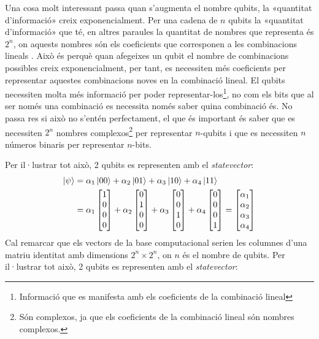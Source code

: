 Una cosa molt interessant passa quan s'augmenta el nombre qubits, la «quantitat d'informació» creix exponencialment. Per una cadena de $n$ qubits la «quantitat d'informació» que té, en altres paraules la quantitat de nombres que representa és $2^n$, on aquests nombres són els coeficients que corresponen a les combinacions lineals . Això és perquè quan afegeixes un qubit el nombre de combinacions possibles creix exponencialment, per tant, es necessiten més coeficients per representar aquestes combinacions noves en la combinació lineal. El qubits necessiten molta més informació per poder representar-los\footnote{Informació que es manifesta amb els coeficients de la combinació lineal}, no com els bits que al ser només una combinació es necessita només saber quina combinació és. No passa res si això no s'entén perfectament, el que és important és saber que es necessiten $2^n$ nombres complexos\footnote{Són complexos, ja que els coeficients de la combinació lineal són nombres complexos.} per representar $n$-qubits i que es necessiten $n$ números binaris per representar $n$-bits.

Per il·lustrar tot això, 2 qubits es representen amb el \textit{statevector}:
\begin{align*}
	\ket{\psi} &= \alpha_1\ket{00} + \alpha_2\ket{01} + \alpha_3\ket{10} + \alpha_4\ket{11}\\
	&= \alpha_1\begin{bmatrix} 1 \\ 0 \\ 0 \\ 0 \end{bmatrix} + \alpha_2 \begin{bmatrix} 0 \\ 1 \\ 0 \\ 0 \end{bmatrix} + \alpha_3 \begin{bmatrix} 0 \\ 0 \\ 1 \\ 0 \end{bmatrix} + \alpha_4\begin{bmatrix} 0 \\ 0 \\ 0 \\ 1 \end{bmatrix} 
	= \begin{bmatrix} \alpha_1 \\ \alpha_2 \\ \alpha_3 \\ \alpha_4 \end{bmatrix}
\end{align*}
Cal remarcar que els vectors de la base computacional serien les columnes d'una matriu identitat amb dimensions $2^n\times 2^n$, on $n$ és el nombre de qubits. Per il·lustrar tot això, 2 qubits es representen amb el \textit{statevector}:

